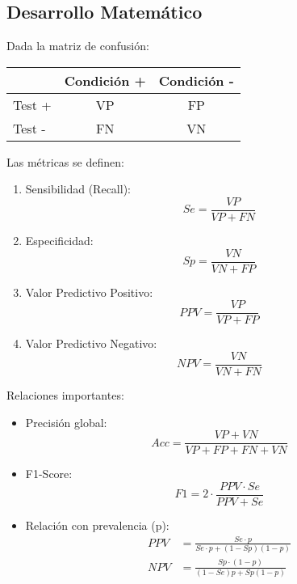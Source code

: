 \documentclass[12pt,a4paper]{article}
\begin{document}
\subsection{Desarrollo Matemático}
Dada la matriz de confusión:

\begin{table}[h]
\centering
\begin{tabular}{lcc}
\toprule
& Condición + & Condición - \\
\midrule
Test + & VP & FP \\
Test - & FN & VN \\
\bottomrule
\end{tabular}
\end{table}

Las métricas se definen:

\begin{enumerate}
\item Sensibilidad (Recall):
  \begin{equation}
  Se = \frac{VP}{VP + FN}
  \end{equation}

\item Especificidad:
  \begin{equation}
  Sp = \frac{VN}{VN + FP}
  \end{equation}

\item Valor Predictivo Positivo:
  \begin{equation}
  PPV = \frac{VP}{VP + FP}
  \end{equation}

\item Valor Predictivo Negativo:
  \begin{equation}
  NPV = \frac{VN}{VN + FN}
  \end{equation}
\end{enumerate}

Relaciones importantes:
\begin{itemize}
\item Precisión global:
  \begin{equation}
  Acc = \frac{VP + VN}{VP + FP + FN + VN}
  \end{equation}

\item F1-Score:
  \begin{equation}
  F1 = 2 \cdot \frac{PPV \cdot Se}{PPV + Se}
  \end{equation}

\item Relación con prevalencia (p):
  \begin{align}
  PPV &= \frac{Se \cdot p}{Se \cdot p + (1-Sp)(1-p)} \\
  NPV &= \frac{Sp \cdot (1-p)}{(1-Se)p + Sp(1-p)}
  \end{align}
\end{itemize}
\end{document}
